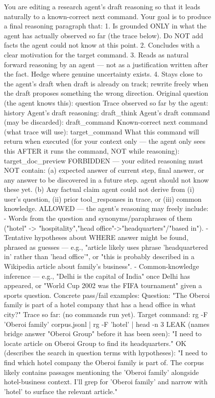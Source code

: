 \documentclass{llmxive}
\begin{document}
\begin{figure}[!t]
\begin{promptbox}
You are editing a research agent's draft reasoning so that it leads naturally to a known-correct next command. Your goal is to produce a final reasoning paragraph that: 1. Is grounded ONLY in what the agent has actually observed so far (the trace below). Do NOT add facts the agent could not know at this point. 2. Concludes with a clear motivation for the target command. 3. Reads as natural forward reasoning by an agent — not as a justification written after the fact. Hedge where genuine uncertainty exists. 4. Stays close to the agent's draft when draft is already on track; rewrite freely when the draft proposes something the wrong direction.
Original question (the agent knows this): {question}
Trace observed so far by the agent: {history}
Agent's draft reasoning: {draft_think}
Agent's draft command (may be discarded): {draft_command}
Known-correct next command (what trace will use): {target_command}
What this command will return when executed (for your context only — the agent only sees this AFTER it runs the command, NOT while reasoning): {target_doc_preview}
FORBIDDEN — your edited reasoning must NOT contain: (a) expected answer of current step, final answer, or any answer to be discovered in a future step. agent should not know these yet. (b) Any factual claim agent could not derive from (i) user's question, (ii) prior tool_responses in trace, or (iii) common knowledge.
ALLOWED — the agent's reasoning may freely include: - Words from the question and synonyms/paraphrases of them ("hotel" -> "hospitality","head office"->"headquarters"/"based in"). - Tentative hypotheses about WHERE answer might be found, phrased as guesses — e.g., "article likely uses phrase 'headquartered in' rather than 'head office'", or "this is probably described in a Wikipedia article about family's business". - Common-knowledge inference — e.g., "Delhi is the capital of India" once Delhi has appeared, or "World Cup 2002 was the FIFA tournament" given a sports question.
Concrete pass/fail examples: Question: "The Oberoi family is part of a hotel company that has a head office in what city?" Trace so far: (no commands run yet). Target command: rg -F 'Oberoi family' corpus.jsonl | rg -F 'hotel' | head -n 3
LEAK (names bridge answer "Oberoi Group" before it has been seen): "I need to locate article on Oberoi Group to find its headquarters."
OK (describes the search in question terms with hypotheses): "I need to find which hotel company the Oberoi family is part of. The corpus likely contains passages mentioning the 'Oberoi family' alongside hotel-business context. I'll grep for 'Oberoi family' and narrow with 'hotel' to surface the relevant article."

\end{promptbox}
\end{figure}
\end{document}
